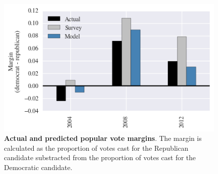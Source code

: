 \documentclass{article}
\begin{document}
	\begin{figure}[h!]
		\begin{center}
			\includegraphics*[width=0.6\linewidth]{margin}
			\caption{\textbf{Actual and predicted popular vote margins}. The margin is calculated as the proportion of votes cast for the Republican candidate substracted from the proportion of votes cast for the Democratic candidate.}
			\label{fig:margin}
		\end{center}
	\end{figure}
\end{document}
